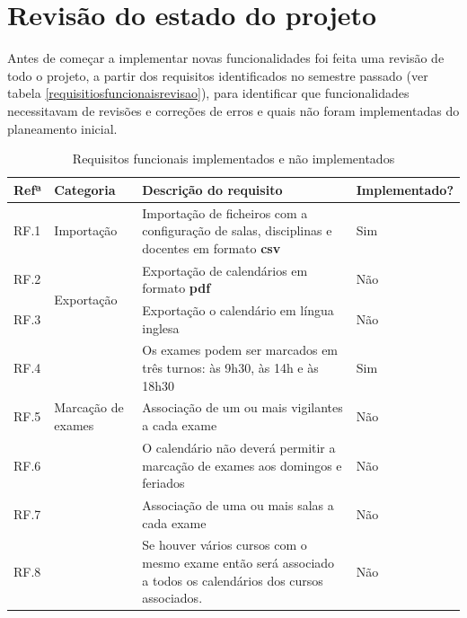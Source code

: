 \documentclass[12pt, twoside]{report}
\begin{document}
	\section{Revisão do estado do projeto}
	
		Antes de começar a implementar novas funcionalidades foi feita uma revisão de todo o projeto, a partir dos requisitos identificados no semestre passado (ver tabela \ref{requisitiosfuncionaisrevisao}), para identificar que funcionalidades necessitavam de revisões e correções de erros e quais não foram implementadas do planeamento inicial.
		
		
	\def\arraystretch{1.5}
	\begin{center}
		\label{requisitiosfuncionaisrevisao}
		\begin{longtable}{|m{1cm}|m{2.2cm}|m{9cm}|m{3cm}|}
			\caption{Requisitos funcionais implementados e não implementados}\\
			
			\hline			
			\textbf{Refª }	& \textbf{Categoria}&\textbf{Descrição do requisito} & \textbf{Implementado?} \\
			\hline
			
			RF.1 &Importação& Importação de ficheiros com a configuração de salas, disciplinas e docentes em formato \textbf{csv} & Sim \\
			\hline
			
			RF.2 &\multirow{2}{2cm}{Exportação}& Exportação de calendários em formato \textbf{pdf} & Não \\
			
			RF.3 && Exportação o calendário em língua inglesa & Não \\
			\hline
			
			RF.4 &\multirow{3}{2cm}{Marcação de exames}& Os exames podem ser marcados em três turnos: às 9h30, às 14h e às 18h30 & Sim \\
			
			RF.5 && Associação de um ou mais vigilantes a cada exame & Não \\
			
			RF.6 && O calendário não deverá permitir a marcação de exames aos domingos e feriados & Não \\
			
			RF.7 &&	Associação de uma ou mais salas a cada exame & Não\\
			
			RF.8 && Se houver vários cursos com o mesmo exame então será associado a todos os calendários dos cursos associados. & Não\\
			\hline
			

\end{longtable}
\end{center}
\end{document}
